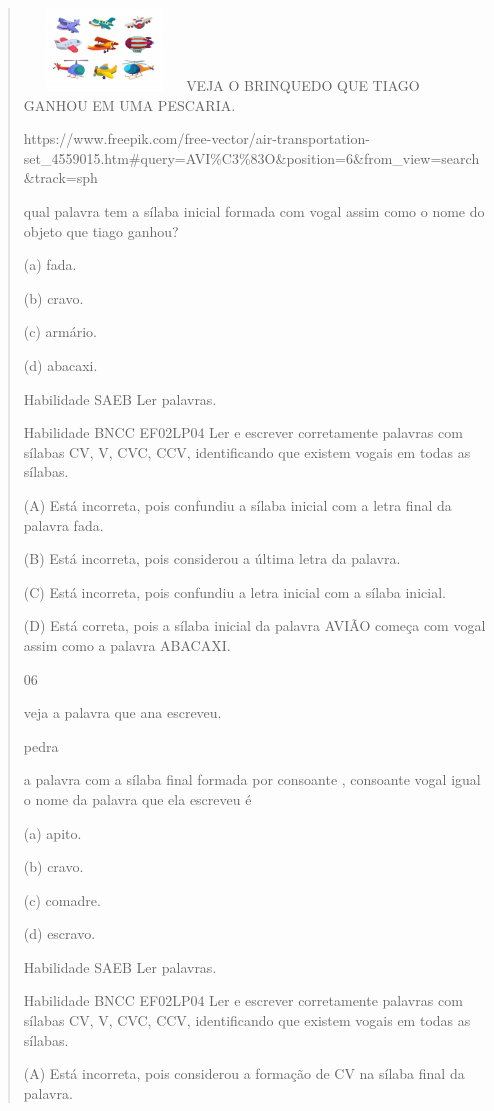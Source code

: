 {{{{\begin{verse}
{{\begin{escolha}
{{{{{\includegraphics[width=1.69097in,height=0.86538in]{media/image177.jpeg}VEJA
O BRINQUEDO QUE TIAGO GANHOU EM UMA PESCARIA.

https://www.freepik.com/free-vector/air-transportation-set\_4559015.htm\#query=AVI\%C3\%83O\&position=6\&from\_view=search\&track=sph

qual palavra tem a sílaba inicial formada com vogal assim como o nome do
objeto que tiago ganhou?

(a) fada.

(b) cravo.

(c) armário.

(d) abacaxi.

Habilidade SAEB Ler palavras.

Habilidade BNCC EF02LP04 Ler e escrever corretamente palavras com
sílabas CV, V, CVC, CCV, identificando que existem vogais em todas as
sílabas.

(A) Está incorreta, pois confundiu a sílaba inicial com a letra final da
palavra fada.

(B) Está incorreta, pois considerou a última letra da palavra.

(C) Está incorreta, pois confundiu a letra inicial com a sílaba inicial.

(D) Está correta, pois a sílaba inicial da palavra AVIÃO começa com
vogal assim como a palavra ABACAXI.

\num{06}

veja a palavra que ana escreveu.

pedra

a palavra com a sílaba final formada por consoante , consoante vogal
igual o nome da palavra que ela escreveu é

(a) apito.

(b) cravo.

(c) comadre.

(d) escravo.

Habilidade SAEB Ler palavras.

Habilidade BNCC EF02LP04 Ler e escrever corretamente palavras com
sílabas CV, V, CVC, CCV, identificando que existem vogais em todas as
sílabas.

(A) Está incorreta, pois considerou a formação de CV na sílaba final da
palavra.

}}}}}
\end{escolha}}}
\end{verse}}}}}
